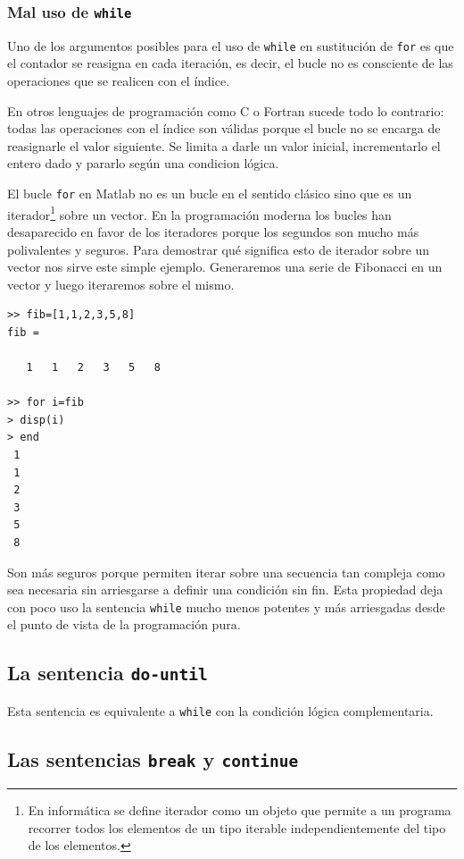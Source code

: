 \subsubsection{Mal uso de \texttt{while}}

Uno de los argumentos posibles para el uso de \texttt{while} en
sustitución de \texttt{for} es que el contador se reasigna en cada
iteración, es decir, el bucle no es consciente de las operaciones que
se realicen con el índice.

En otros lenguajes de programación como C o Fortran sucede todo lo
contrario: todas las operaciones con el índice son válidas porque el
bucle no se encarga de reasignarle el valor siguiente. Se limita a
darle un valor inicial, incrementarlo el entero dado y pararlo según
una condicion lógica.

El bucle \texttt{for} en Matlab no es un bucle en el sentido clásico
sino que es un iterador\footnote{En informática se define iterador
  como un objeto que permite a un programa recorrer todos los
  elementos de un tipo iterable independientemente del tipo de los
  elementos.} sobre un vector. En la programación moderna los bucles
han desaparecido en favor de los iteradores porque los segundos son
mucho más polivalentes y seguros.  Para demostrar qué significa esto
de iterador sobre un vector nos sirve este simple ejemplo.
Generaremos una serie de Fibonacci en un vector y luego iteraremos
sobre el mismo.

\begin{lstlisting}
>> fib=[1,1,2,3,5,8]
fib =

   1   1   2   3   5   8

>> for i=fib
> disp(i)
> end
 1
 1
 2
 3
 5
 8
\end{lstlisting}

Son más seguros porque permiten iterar sobre una secuencia tan
compleja como sea necesaria sin arriesgarse a definir una condición
sin fin.  Esta propiedad deja con poco uso la sentencia
\texttt{while} mucho menos potentes y más arriesgadas desde el punto
de vista de la programación pura.

\subsection{La sentencia \texttt{do-until}}

Esta sentencia es equivalente a \texttt{while} con la condición lógica
complementaria.


\subsection{Las sentencias \texttt{break} y
  \texttt{continue}}

